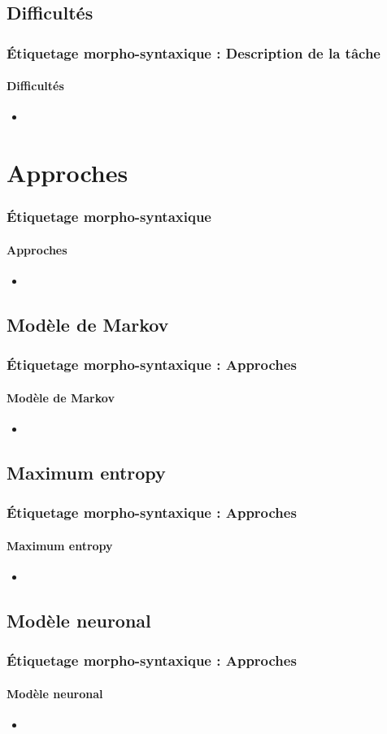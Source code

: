 \documentclass[xcolor=table]{beamer}
\begin{document}
\subsection{Difficultés}

\begin{frame}
\frametitle{Étiquetage morpho-syntaxique : Description de la tâche}
\framesubtitle{Difficultés}

\begin{itemize}
	\item 
\end{itemize}

\end{frame}

\section{Approches}

\begin{frame}
\frametitle{Étiquetage morpho-syntaxique}
\framesubtitle{Approches}

\begin{itemize}
	\item 
\end{itemize}

\end{frame}

\subsection{Modèle de Markov}

\begin{frame}
\frametitle{Étiquetage morpho-syntaxique : Approches}
\framesubtitle{Modèle de Markov}

\begin{itemize}
	\item 
\end{itemize}

\end{frame}

\subsection{Maximum entropy}

\begin{frame}
\frametitle{Étiquetage morpho-syntaxique : Approches}
\framesubtitle{Maximum entropy}

\begin{itemize}
	\item 
\end{itemize}

\end{frame}

\subsection{Modèle neuronal}

\begin{frame}
\frametitle{Étiquetage morpho-syntaxique : Approches}
\framesubtitle{Modèle neuronal}

\begin{itemize}
	\item 
\end{itemize}

\end{frame}

\end{document}
